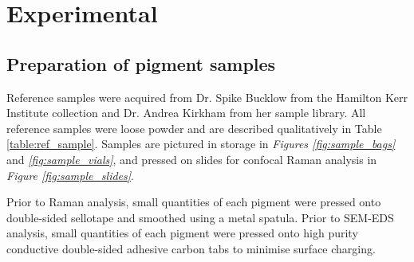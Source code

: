 
\chapter{Experimental} %

\ifpdf
    \graphicspath{{Chapter2/Figs/Raster/}{Chapter2/Figs/PDF/}{Chapter2/Figs/}}
\else
    \graphicspath{{Chapter2/Figs/Vector/}{Chapter2/Figs/}}
\fi


\section[Preparation of samples]{Preparation of pigment samples} 
\label{section2.1}

Reference samples were acquired from Dr. Spike Bucklow from the Hamilton Kerr Institute collection and Dr. Andrea Kirkham from her sample library. All reference samples were loose powder and are described qualitatively in Table \ref{table:ref_sample}. Samples are pictured in storage in \textit{Figures \ref{fig:sample_bags}} and \textit{\ref{fig:sample_vials}}, and pressed on slides for confocal Raman analysis in \textit{Figure \ref{fig:sample_slides}}.

Prior to Raman analysis, small quantities of each pigment were pressed onto double-sided sellotape and smoothed using a metal spatula. Prior to SEM-EDS analysis, small quantities of each pigment were pressed onto high purity conductive double-sided adhesive carbon tabs to minimise surface charging.

